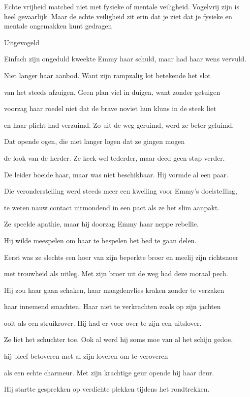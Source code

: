 Echte vrijheid matched niet met fysieke of mentale veiligheid. Vogelvrij zijn is heel gevaarlijk. Maar de echte veiligheid zit erin dat je ziet dat je fysieke en mentale ongemakken kunt gedragen

Uitgevogeld

Einfach zijn ongeduld
kweekte Emmy haar schuld,
maar had haar wens vervuld.

Niet langer haar aanbod.
Want zijn rampzalig lot
betekende het slot

van het steeds afzuigen.
Geen plan viel in duigen,
want zonder getuigen

voorzag haar roedel niet
dat de brave noviet
hun kluns in de steek liet

en haar plicht had verzuimd.
Zo uit de weg geruimd,
werd ze beter geluimd.

Dat opende ogen,
die niet langer logen
dat ze gingen mogen

de look van de herder.
Ze keek wel tederder,
maar deed geen stap verder.

De leider boeide haar,
maar was niet beschikbaar.
Hij vormde al een paar.

Die veronderstelling
werd steeds meer een kwelling
voor Emmy’s doelstelling,

te weten nauw contact
uitmondend in een pact
als ze het slim aanpakt.

Ze speelde apathie,
maar hij doorzag Emmy
haar neppe rebellie.

Hij wilde meespelen
om haar te bespelen
het bed te gaan delen.

Eerst was ze slechts een hoer
van zijn beperkte broer
en meelij zijn richtsnoer

met trouwheid als uitleg.
Met zijn broer uit de weg
had deze moraal pech.

Hij zou haar gaan schaken,
haar maagdenvlies kraken
zonder te verzaken

haar innemend smachten.
Haar niet te verkrachten
zoals op zijn jachten

ooit als een struikrover.
Hij had er voor over
te zijn een uitslover.

Ze liet het schuchter toe.
Ook al werd hij soms moe
van al het schijn gedoe,

hij bleef betoveren
met al zijn loveren
om te veroveren

als een echte charmeur.
Met zijn krachtige geur
opende hij haar deur.

Hij startte gesprekken
op verdichte plekken
tijdens het rondtrekken.

